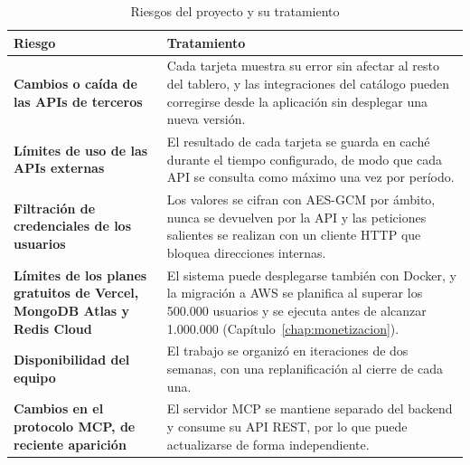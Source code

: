 \begin{table}[H]
  \centering
  \renewcommand{\arraystretch}{1.25}
  \begin{tabularx}{\textwidth}{>{\bfseries}p{} X}
    \toprule
    Riesgo & Tratamiento \\
    \midrule
    Cambios o caída de las APIs de terceros & Cada tarjeta muestra su error sin afectar al resto del tablero, y las integraciones del catálogo pueden corregirse desde la aplicación sin desplegar una nueva versión. \\
    Límites de uso de las APIs externas & El resultado de cada tarjeta se guarda en caché durante el tiempo configurado, de modo que cada API se consulta como máximo una vez por período. \\
    Filtración de credenciales de los usuarios & Los valores se cifran con AES-GCM por ámbito, nunca se devuelven por la API y las peticiones salientes se realizan con un cliente HTTP que bloquea direcciones internas. \\
    Límites de los planes gratuitos de Vercel, MongoDB Atlas y Redis Cloud & El sistema puede desplegarse también con Docker, y la migración a AWS se planifica al superar los 500.000 usuarios y se ejecuta antes de alcanzar 1.000.000 (Capítulo~\ref{chap:monetizacion}). \\
    Disponibilidad del equipo & El trabajo se organizó en iteraciones de dos semanas, con una replanificación al cierre de cada una. \\
    Cambios en el protocolo MCP, de reciente aparición & El servidor MCP se mantiene separado del backend y consume su API REST, por lo que puede actualizarse de forma independiente. \\
    \bottomrule
  \end{tabularx}
  \caption{Riesgos del proyecto y su tratamiento}
  \label{tab:riesgos}
\end{table}